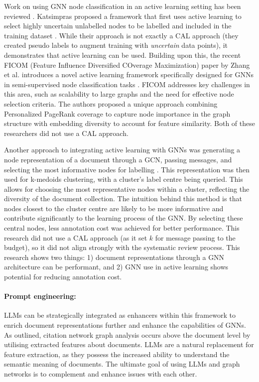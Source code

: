 \documentclass[10pt,oneside]{book}
\begin{document}
Work on using GNN node classification in an active learning setting has been reviewed \cite{madhawa_active_2020}. Katsimpras proposed a framework that first uses active learning to select highly uncertain unlabelled nodes to be labelled and included in the training dataset \cite{katsimpras_improving_2024}. While their approach is not exactly a CAL approach (they created pseudo labels to augment training with \emph{uncertain} data points), it demonstrates that active learning can be used. Building upon this, the recent FICOM (Feature Influence Diversified COverage Maximization) paper by Zhang et al. introduces a novel active learning framework specifically designed for GNNs in semi-supervised node classification tasks \cite{zhang_ficom_2024}. FICOM addresses key challenges in this area, such as scalability to large graphs and the need for effective node selection criteria. The authors proposed a unique approach combining Personalized PageRank coverage to capture node importance in the graph structure with embedding diversity to account for feature similarity. Both of these researchers did not use a CAL approach.

Another approach to integrating active learning with GNNs was generating a node representation of a document through a GCN, passing messages, and selecting the most informative nodes for labelling \cite{wu_active_2021}. This representation was then used for k-medoids clustering, with a cluster's label centre being queried. This allows for choosing the most representative nodes within a cluster, reflecting the diversity of the document collection. The intuition behind this method is that nodes closest to the cluster centre are likely to be more informative and contribute significantly to the learning process of the GNN. By selecting these central nodes, less annotation cost was achieved for better performance. This research did not use a CAL approach (as it set $k$ for message passing to the budget), so it did not align strongly with the systematic review process. This research shows two things: 1) document representations through a GNN architecture can be performant, and 2) GNN use in active learning shows potential for reducing annotation cost.

\paragraph{Prompt engineering: }

LLMs can be strategically integrated as enhancers within this framework to enrich document representations further and enhance the capabilities of GNNs. As outlined, citation network graph analysis occurs above the document level by utilising extracted features about documents. LLMs are a natural replacement for feature extraction, as they possess the increased ability to understand the semantic meaning of documents. The ultimate goal of using LLMs and graph networks is to complement and enhance issues with each other. 
\end{document}
